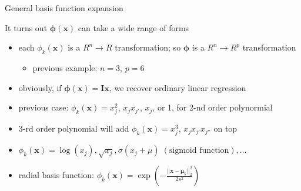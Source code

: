\documentclass[ignorenonframetext,aspectratio=169]{beamer}
\providecommand{\tightlist}{%
  \setlength{\itemsep}{0pt}\setlength{\parskip}{0pt}}
\newcommand{\vv}[1]{\boldsymbol{#1}}
\begin{document}
\begin{frame}{General basis function expansion}
\protect\hypertarget{general-basis-function-expansion}{}

It turns out \(\vv{\phi}{(\vv{x})}\) can take a wide range of forms

\begin{itemize}
\tightlist
\item
  each \(\phi_k(\vv{x})\) is a \(R^n\rightarrow R\) transformation; so
  \(\vv{\phi}\) is a \(R^n\rightarrow R^p\) transformation

  \begin{itemize}
  \tightlist
  \item
    previous example: \(n=3\), \(p=6\)
  \end{itemize}
\item
  obviously, if \(\vv{\phi}(\vv{x}) = \vv{I}\vv{x}\), we recover
  ordinary linear regression
\item
  previous case: \(\phi_k(\vv{x}) = x_j^2\), \(x_jx_{j'}\), \(x_j\), or
  1, for 2-nd order polynormial
\item
  3-rd order polynomial will add \(\phi_k(\vv{x}) = x_j^3\),
  \(x_jx_{j'}x_{j''}\) on top
\item
  \(\phi_k(\vv{x}) = \log(x_j), \sqrt{x_j}, \sigma(x_j+\mu)\; (\text{sigmoid function}), \ldots\)
\item
  radial basis function:
  \(\phi_k(\vv{x}) = \exp\left (-\frac{||\vv{x}-\vv{\mu}_k||_2^2}{2s^2}\right )\)
\end{itemize}


\end{frame}
\end{document}
